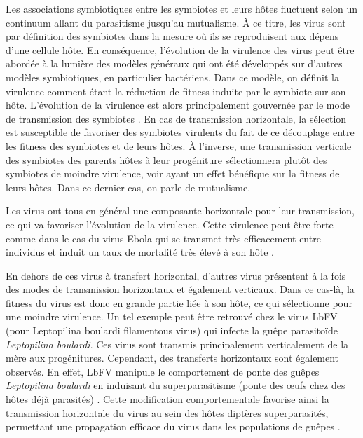 Les associations symbiotiques entre les symbiotes et leurs hôtes fluctuent selon un continuum allant du parasitisme jusqu’au mutualisme. À ce titre, les virus sont par définition des symbiotes dans la mesure où ils se reproduisent aux dépens d'une cellule hôte. En conséquence, l'évolution de la virulence des virus peut être abordée à la lumière des modèles généraux qui ont été développés sur d'autres modèles symbiotiques, en particulier bactériens. Dans ce modèle, on définit la virulence comment étant la réduction de fitness induite par le symbiote sur son hôte. L'évolution de la virulence est alors principalement gouvernée par le mode de transmission des symbiotes \citep{smith_geneseye_2007}. En cas de transmission horizontale, la sélection est susceptible de favoriser des symbiotes virulents du fait de ce découplage entre les fitness des symbiotes et  de leurs hôtes. À l'inverse, une transmission verticale des symbiotes des parents hôtes à leur progéniture sélectionnera plutôt des symbiotes de moindre virulence, voir ayant un effet bénéfique sur la fitness de leurs hôtes. Dans ce dernier cas, on parle de mutualisme.

Les virus ont tous en général une composante horizontale pour leur transmission, ce qui va favoriser l'évolution de la virulence. Cette virulence peut être forte comme dans le cas du virus Ebola qui se transmet très efficacement entre individus et induit un taux de mortalité très élevé à son hôte \citep{kadanali_overview_2016}. 

En dehors de ces virus à transfert horizontal, d'autres virus présentent à la fois des modes de transmission horizontaux et également verticaux. Dans ce cas-là, la fitness du virus est donc en grande partie liée à son hôte, ce qui sélectionne pour une moindre virulence. Un tel exemple peut être retrouvé chez le virus LbFV (pour Leptopilina boulardi filamentous virus)  qui infecte la guêpe parasitoïde \textit{Leptopilina boulardi}. Ces virus sont transmis principalement verticalement de la mère aux progénitures. Cependant, des transferts horizontaux sont également observés. En effet, LbFV manipule le comportement de ponte des guêpes \textit{Leptopilina boulardi} en induisant du superparasitisme (ponte des œufs chez des hôtes déjà parasités) \citep{varaldi_infectious_2003,varaldi_artifical_2006}. Cette modification comportementale favorise ainsi la transmission horizontale du virus au sein des hôtes diptères superparasités, permettant une propagation efficace du virus dans les populations de guêpes \citep{gandon_superparasitism_2006}. 

